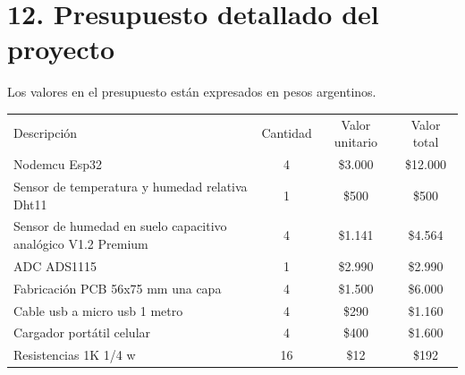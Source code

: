 \documentclass[
11pt, %
codirector, %
]{charter}
\begin{document}
\section{12. Presupuesto detallado del proyecto}
\label{sec:presupuesto}

Los valores en el presupuesto están expresados en pesos argentinos.

\begin{table}[htpb]
\centering
\begin{tabularx}{\linewidth}{@{}|X|c|r|r|@{}}
\hline
\rowcolor[HTML]{C0C0C0} 
\multicolumn{4}{|c|}{\cellcolor[HTML]{C0C0C0}COSTOS DIRECTOS} \\ \hline
\rowcolor[HTML]{C0C0C0} 
Descripción &
  \multicolumn{1}{c|}{\cellcolor[HTML]{C0C0C0}Cantidad} &
  \multicolumn{1}{c|}{\cellcolor[HTML]{C0C0C0}Valor unitario} &
  \multicolumn{1}{c|}{\cellcolor[HTML]{C0C0C0}Valor total} \\ \hline
  
 Nodemcu Esp32&
  \multicolumn{1}{c|}{4} &
  \multicolumn{1}{c|}{\$3.000} &
  \multicolumn{1}{c|}{\$12.000} \\ \hline

 Sensor de temperatura y humedad relativa Dht11&
  \multicolumn{1}{c|}{1} &
  \multicolumn{1}{c|}{\$500} &
  \multicolumn{1}{c|}{\$500} \\ \hline

 Sensor de humedad en suelo capacitivo analógico V1.2 Premium&
  \multicolumn{1}{c|}{4} &
  \multicolumn{1}{c|}{\$1.141} &
  \multicolumn{1}{c|}{\$4.564} \\ \hline

 ADC ADS1115&
  \multicolumn{1}{c|}{1} &
  \multicolumn{1}{c|}{\$2.990} &
  \multicolumn{1}{c|}{\$2.990} \\ \hline

 Fabricación PCB 56x75 mm una capa&
  \multicolumn{1}{c|}{4} &
  \multicolumn{1}{c|}{\$1.500} &
  \multicolumn{1}{c|}{\$6.000} \\ \hline

 Cable usb a micro usb 1 metro&
  \multicolumn{1}{c|}{4} &
  \multicolumn{1}{c|}{\$290} &
  \multicolumn{1}{c|}{\$1.160} \\ \hline

 Cargador portátil celular&
  \multicolumn{1}{c|}{4} &
  \multicolumn{1}{c|}{\$400} &
  \multicolumn{1}{c|}{\$1.600} \\ \hline

 Resistencias 1K 1/4 w&
  \multicolumn{1}{c|}{16} &
  \multicolumn{1}{c|}{\$12} &
  \multicolumn{1}{c|}{\$192} \\ \hline


\end{tabularx}
\end{table}
\end{document}
